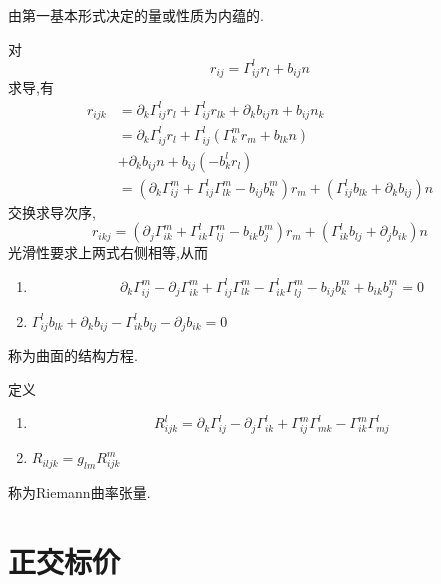 \documentclass[../../古典微分几何.tex]{subfiles}
\begin{document}
\begin{definition}
    由第一基本形式决定的量或性质为内蕴的.
\end{definition}


对 \[
r_{ij}=  \Gamma _{ij}^{l}r_{l}+ b_{ij}n
\]求导,有 \[
\begin{aligned}
r_{ijk}& =  \partial _{k} \Gamma _{ij}^{l}r_{l}+  \Gamma _{ij}^{l}r_{lk}+  \partial _{k}b_{ij}n+ b_{ij}n_{k}\\ 
 & =  \partial _{k} \Gamma _{ij}^{l}r_{l}+  \Gamma _{ij}^{l}\left(  \Gamma _{k}^{m}r_{m}+ b_{lk}n \right)\\ 
  &+  \partial _{k}b_{ij}n+ b_{ij}\left( -b_{k}^{l}r_{l} \right) \\ 
   & = \left(  \partial _{k} \Gamma _{ij}^{m}+  \Gamma _{ij}^{l} \Gamma _{lk}^{m}-b_{ij}b_{k}^{m} \right)r_{m}+ \left(  \Gamma _{ij}^{l}b_{lk}+  \partial _{k}b_{ij} \right)n    
\end{aligned}
\]交换求导次序, \[
r_{ikj}= \left(  \partial _{j} \Gamma _{ik}^{m}+  \Gamma _{ik}^{l} \Gamma _{lj}^{m}-b_{ik}b_{j}^{m} \right)r_{m}+ \left(  \Gamma _{ik}^{l}b_{lj}+  \partial_{j}b_{ik}\right)n  
\]光滑性要求上两式右侧相等,从而 
\begin{proposition}
    \begin{enumerate}
        \item \[
 \partial _{k} \Gamma _{ij}^{m}- \partial _{j} \Gamma _{ik}^{m}+  \Gamma _{ij}^{l} \Gamma _{lk}^{m}- \Gamma _{ik}^{l} \Gamma _{lj}^{m}-b_{ij}b_{k}^{m}+ b_{ik}b_{j}^{m}= 0
\]
\item \(   \Gamma _{ij}^{l}b_{lk}+  \partial _{k}b_{ij}- \Gamma _{ik}^{l}b_{lj}- \partial _{j}b_{ik}= 0  \) 
    \end{enumerate}
    称为曲面的结构方程.
    
\end{proposition}

\begin{definition}{定义}
    \begin{enumerate}
        \item \[
    R_{ijk}^{l}=  \partial _{k} \Gamma _{ij}^{l}- \partial _{j} \Gamma _{ik}^{l}+  \Gamma _{ij}^{m} \Gamma _{mk}^{l}- \Gamma _{ik}^{m} \Gamma _{mj}^{l}
    \]
    \item \(  R_{iljk}= g_{lm}R_{ijk}^{m}  \) 
    \end{enumerate}
    称为Riemann曲率张量.
\end{definition}




\section{正交标价}
\end{document}
